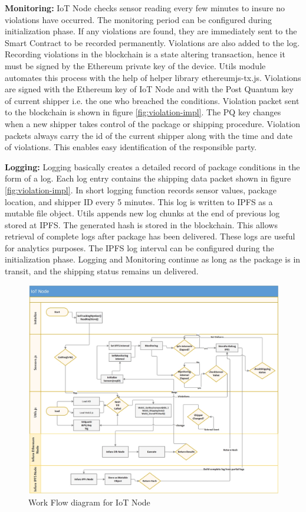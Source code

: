 \textbf{Monitoring:}
IoT Node checks sensor reading every few minutes to insure no violations have occurred. The monitoring period can be configured during initialization phase. If any violations are found, they are immediately sent to the Smart Contract to be recorded permanently. Violations are also added to the log. Recording violations in the blockchain is a state altering transaction, hence it must be signed by the Ethereum private key of the device. Utils module automates this process with the help of helper library ethereumjs-tx.js. Violations are signed with the Ethereum key of IoT Node and with the Post Quantum key of current shipper i.e. the one who breached the conditions. Violation packet sent to the blockchain is shown in figure \ref{fig:violation-impl}. The PQ key changes when a new shipper takes control of the package or shipping procedure.  Violation packets always carry the id of the current shipper along with the time and date of violations. This enables easy identification of the responsible party.

\textbf{Logging:}
Logging basically creates a detailed record of package conditions in the form of a log.  Each log entry contains the shipping data packet shown in figure \ref{fig:violation-impl}. In short logging function records sensor values, package location, and shipper ID every 5 minutes. This log is written to IPFS as a mutable file object. Utils appends new log chunks at the end of previous log stored at IPFS. The generated hash is stored in the blockchain. This allows retrieval of complete logs after package has been delivered. These logs are useful for analytics purposes. The IPFS log interval can be configured during the initialization phase. Logging and Monitoring continue as long as the package is in transit, and the shipping status remains un delivered.

\begin{figure}[h]
	\centering
    \includegraphics[width=145mm,scale=1]{figs/IoTNode}
	\caption{Work Flow diagram for IoT Node}
	\label{fig:IoTNode} 
\end{figure}
\clearpage

